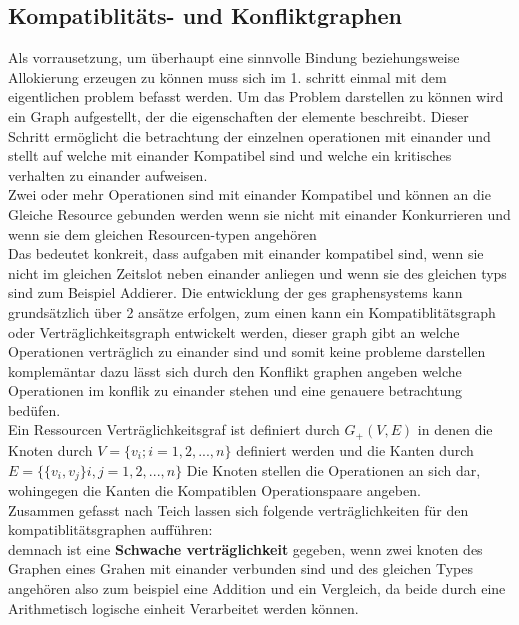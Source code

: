 \documentclass[conference]{IEEEtran}
\begin{document}
\subsection{Kompatiblitäts- und Konfliktgraphen}
Als vorrausetzung, um überhaupt eine sinnvolle Bindung beziehungsweise Allokierung erzeugen zu können muss sich im 1. schritt einmal mit dem eigentlichen problem befasst werden. Um das Problem darstellen zu können wird ein Graph aufgestellt, der die eigenschaften der elemente beschreibt. Dieser Schritt ermöglicht die betrachtung der einzelnen operationen mit einander und stellt auf welche mit einander Kompatibel sind und welche ein kritisches verhalten zu einander aufweisen.\\
Zwei oder mehr Operationen sind mit einander Kompatibel und können an die Gleiche Resource gebunden werden wenn sie nicht mit einander Konkurrieren und wenn sie dem gleichen Resourcen-typen angehören\cite[S.231]{3}\\
Das bedeutet konkreit, dass aufgaben mit einander kompatibel sind, wenn sie nicht im gleichen Zeitslot neben einander anliegen und wenn sie des gleichen typs sind zum Beispiel Addierer.
Die entwicklung der ges graphensystems kann grundsätzlich über 2 ansätze erfolgen, zum einen kann ein Kompatiblitätsgraph oder Verträglichkeitsgraph entwickelt werden, dieser graph gibt an welche Operationen verträglich zu einander sind und somit keine probleme darstellen komplemäntar dazu lässt sich durch den Konflikt graphen angeben welche Operationen im konflik zu einander stehen und eine genauere betrachtung bedüfen.\\
Ein Ressourcen Verträglichkeitsgraf ist definiert durch $ G_+(V,E)$ in denen die Knoten durch $ V = \{v_i;i=1,2,...,n\}$ definiert werden und die Kanten durch $E = \{\{v_i,v_j\}i,j = 1,2,...,n\}$ Die Knoten stellen die Operationen an sich dar, wohingegen die Kanten die Kompatiblen Operationspaare angeben\cite[S.231]{3}.\\
Zusammen gefasst nach  Teich \cite[S. 181-182]{1} lassen sich folgende verträglichkeiten für den kompatiblitätsgraphen aufführen:\\

demnach ist eine \textbf{Schwache verträglichkeit} gegeben, wenn zwei knoten des Graphen
eines Grahen mit einander verbunden sind und des gleichen Types angehören also zum beispiel eine Addition und ein Vergleich, da beide durch eine Arithmetisch logische einheit Verarbeitet werden können.\cite{?}\\
\end{document}
